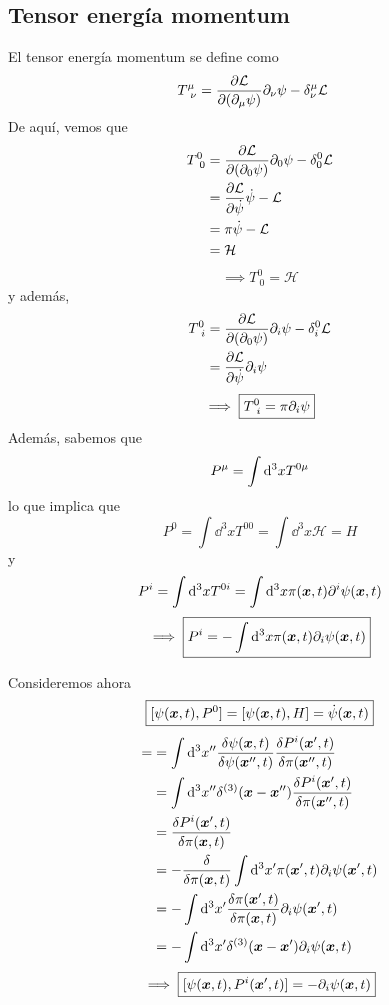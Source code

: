 \subsection{Tensor energía momentum}
El tensor energía momentum se define como
\begin{align}
  T^\mu_{~\nu }&=\pdv{\mathcal{L}}{(\partial_\mu\psi)}\partial_\nu \psi-\delta^\mu_\nu \mathcal{L} 
\end{align}
De aquí, vemos que
\begin{align}
  T^0_{~0 }&=\pdv{\mathcal{L}}{(\partial_0 \psi)}\partial_0 \psi-\delta^0_0 \mathcal{L} \\
  &=\pdv{\mathcal{L}}{\dot{\psi}}\dot{\psi}-\mathcal{L}\\
  &=\pi\dot{\psi}-\mathcal{L} \\
  &=\mathcal{H}
\end{align}
\begin{equation}
  \implies  \boxed{T^0_{~0 }=\mathcal{H}}
\end{equation}
y además,
\begin{align}
  T^0_{~i }&=\pdv{\mathcal{L}}{(\partial_0 \psi)}\partial_i \psi-\delta^0_i \mathcal{L} \\
  &=\pdv{\mathcal{L}}{\dot{\psi}}\partial_i\psi
\end{align}
\begin{equation}
  \implies\boxed{ T^0_{~i }=\pi \partial_i\psi}
\end{equation}
Además, sabemos que
\begin{equation}
  P^\mu =\int\dd^3xT^{0\mu }
\end{equation}
lo que implica que
\begin{equation}
 \boxed{ P^0=\int\dd^3xT^{00}=\int\dd^3x\mathcal{H}=H}
\end{equation}
y
\begin{align}
  P^{i}=\int\dd^3xT^{0i}=\int\dd^3x\pi(\vb*{x},t)\partial^{i}\psi(\vb*{x},t) 
\end{align}
\begin{equation}
  \implies\boxed{ P^{i}=-\int\dd^3x\pi(\vb*{x},t)\partial_i\psi(\vb*{x},t)}
\end{equation}

Consideremos ahora
\begin{equation}
  \boxed{[\psi(\vb*{x},t),P^0]=[\psi(\vb*{x},t),H]=\dot{\psi}(\vb*{x},t) }
\end{equation}
\begin{align}
  [\psi\xt ,P^{i}\xpt ]=&=\int\dd^3x''\frac{\d\psi\xt }{\d\psi\xppt }\frac{\d P^{i}\xpt }{\d\p\xppt }\\
  &=\int\dd^3x''\dxxpp\frac{\d P^{i}\xpt }{\d\p\xppt }\\
  &=\frac{\d P^{i}\xpt }{\d\p \xt }\\
  &=-\frac{\d }{\d\p\xt }\int\dd^3x'\p\xpt\partial_i\psi\xpt \\
  &=-\int\dd^3x'\frac{\d \p\xpt}{\d\p\xt }\partial_i\psi\xpt \\
  &=-\int\dd^3x'\dxxp\partial_i\psi\xt 
\end{align}
\begin{equation}
  \implies \boxed{[\psi(\vb*{x},t) ,P^{i}(\vb*{x}',t) ]=-\partial_i\psi(\vb*{x},t) }
\end{equation}

